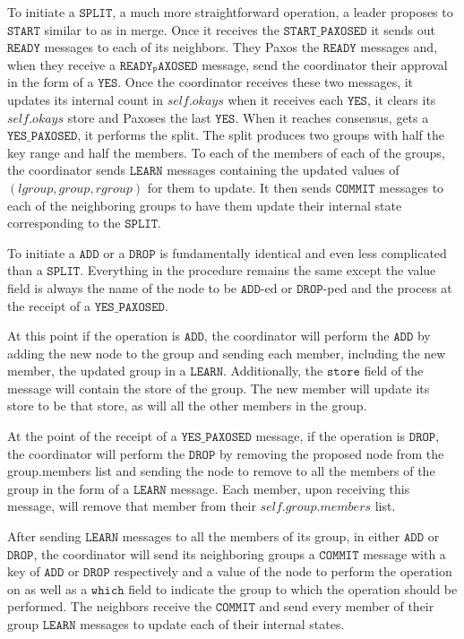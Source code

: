 \documentclass{amsart}
\theoremstyle{definition}
\theoremstyle{remark}
\numberwithin{equation}{section}
\begin{document}
To initiate a $\mathtt{SPLIT}$, a much more straightforward operation, a leader proposes to $\mathtt{START}$ similar to as in merge. Once it receives the $\mathtt{START\_PAXOSED}$ it sends out $\mathtt{READY}$ messages to each of its neighbors. They Paxos the $\mathtt{READY}$ messages and, when they receive a $\mathtt{READY_PAXOSED}$ message, send the coordinator their approval in the form of a $\mathtt{YES}$. Once the coordinator receives these two messages, it updates its internal count in $self.okays$ when it receives each $\mathtt{YES}$, it clears its $self.okays$ store and Paxoses the last $\mathtt{YES}$. When it reaches consensus, gets a $\mathtt{YES\_PAXOSED}$, it performs the split. The split produces two groups with half the key range and half the members. To each of the members of each of the groups, the coordinator sends $\mathtt{LEARN}$ messages containing the updated values of $(lgroup, group, rgroup)$ for them to update. It then sends $\mathtt{COMMIT}$ messages to each of the neighboring groups to have them update their internal state corresponding to the $\mathtt{SPLIT}$. 

To initiate a $\mathtt{ADD}$ or a $\mathtt{DROP}$ is fundamentally identical and even less complicated than a $\mathtt{SPLIT}$. Everything in the procedure remains the same except the value field is always the name of the node to be $\mathtt{ADD}$-ed or $\mathtt{DROP}$-ped and the process at the receipt of a $\mathtt{YES\_PAXOSED}$. 

At this point if the operation is $\mathtt{ADD}$, the coordinator will perform the $\mathtt{ADD}$ by adding the new node to the group and sending each member, including the new member, the updated group in a $\mathtt{LEARN}$. Additionally, the $\mathtt{store}$ field of the message will contain the store of the group. The new member will update its store to be that store, as will all the other members in the group. 

At the point of the receipt of a $\mathtt{YES\_PAXOSED}$ message, if the operation is $\mathtt{DROP}$, the coordinator will perform the $\mathtt{DROP}$ by removing the proposed node from the group.members list and sending the node to remove to all the members of the group in the form of a $\mathtt{LEARN}$ message. Each member, upon receiving this message, will remove that member from their $self.group.members$ list.

After sending $\mathtt{LEARN}$ messages to all the members of its group, in either $\mathtt{ADD}$ or $\mathtt{DROP}$, the coordinator will send its neighboring groups a $\mathtt{COMMIT}$ message with a key of $\mathtt{ADD}$ or $\mathtt{DROP}$ respectively and a value of the node to perform the operation on as well as a $\mathtt{which}$ field to indicate the group to which the operation should be performed. The neighbors receive the $\mathtt{COMMIT}$ and send every member of their group $\mathtt{LEARN}$ messages to update each of their internal states.
\end{document}
